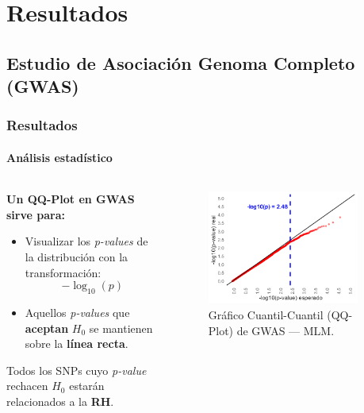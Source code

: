 \documentclass[9pt,aspectratio=169]{beamer}
\begin{document}
\section{Resultados}

\subsection{Estudio de Asociación Genoma Completo (GWAS)}
\begin{frame}
    \frametitle{Resultados}
    \framesubtitle{Análisis estadístico}

    \begin{columns}[c]
        \begin{column}{0.45\textwidth}
            \textbf{Un QQ-Plot en GWAS sirve para:}

            \begin{itemize}
               \item Visualizar los \textit{p-values} de la distribución con la transformación:\\$$-\log_{10}(p)$$
               \item Aquellos \textit{p-values} que \textbf{aceptan} $H_0$ se mantienen sobre la \textbf{línea recta}.
            \end{itemize}

            \begin{block}{}
                Todos los SNPs cuyo \textit{p-value} rechacen $H_0$ estarán relacionados a la \textbf{RH}.
            \end{block}
        \end{column}
        \begin{column}{0.5\textwidth}
            \begin{figure}
                \centering
                \includegraphics[width=0.90\textwidth]{figuras/QQPlot.png}
                \caption{Gráfico Cuantil-Cuantil (QQ-Plot) de GWAS --- MLM.}
                \label{fig:qqplot}
            \end{figure}
        \end{column}
    \end{columns}

\end{frame}
\end{document}
